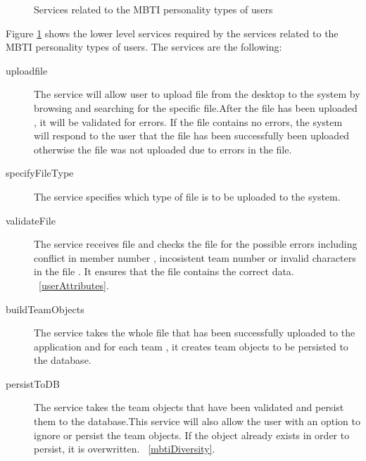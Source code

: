 \begin{figure}[htb]
\begin{center}
\end{center}
\caption{Services related to the MBTI personality types of users \label{fig:mbti_functionalRequirements}}
\end{figure}

Figure \ref{fig:mbti_functionalRequirements} shows the lower level services required by the services related to the MBTI personality types of users. The services are the following:

\begin{description}
\item[uploadfile] The service will allow user to upload file from the desktop to the system  by browsing and searching for the specific file.After the file has been uploaded , it will be validated for errors. If the file contains no errors, the system will respond to the user that the file has been successfully been uploaded otherwise the file was not uploaded due to errors in the file.

\item[specifyFileType] The service specifies which type of file is to be uploaded to the system.

\item[validateFile] The service receives file and checks the file for the possible errors including conflict in member number , incosistent team number or invalid characters in the file . It ensures that the file contains the correct data.  ~\ref{userAttributes}.

\item[buildTeamObjects] The service takes the whole file that has been successfully uploaded to the application and for each team , it creates team objects to be persisted to the database. 

\item[persistToDB] The service takes the team objects that have been validated and persist them to the database.This service will also allow the user with an option to ignore or persist the team objects. If the object already exists in order to persist, it is overwritten.
~\ref{mbtiDiversity}.
\end{description}  



